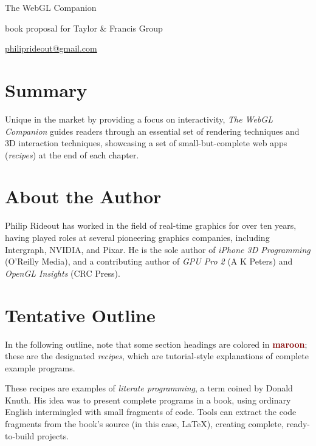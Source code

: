 \thispagestyle{empty}
\label{Proposal}
\LARGE

\noindent The WebGL Companion


\vspace{0.25in}
\noindent book proposal for Taylor \& Francis Group

\noindent \href{mailto:philiprideout@gmail.com}{philiprideout@gmail.com}
\normalsize

\renewcommand{\labelenumi}{Chapter \arabic{enumi}. }

\section*{Summary}
Unique in the market by providing a focus on interactivity, \emph{The WebGL Companion} guides readers through an essential set of rendering techniques and 3D interaction techniques, showcasing a set of small-but-complete web apps (\emph{recipes}) at the end of each chapter.

\section*{About the Author}

Philip Rideout has worked in the field of real-time graphics for over ten years, having played roles at several pioneering graphics companies, including Intergraph, NVIDIA, and Pixar.  He is the sole author of \emph{iPhone 3D Programming} (O'Reilly Media), and a contributing author of \emph{GPU Pro 2} (A K Peters) and \emph{OpenGL Insights} (CRC Press).

\section*{Tentative Outline}

In the following outline, note that some section headings are colored in \textbf{\textcolor{Maroon}{maroon}}; these are the designated \emph{recipes}, which are tutorial-style explanations of complete example programs.

These recipes are examples of \emph{literate programming}, a term coined by Donald Knuth.  His idea was to present complete programs in a book, using ordinary English intermingled with small fragments of code.  Tools can extract the code fragments from the book's source (in this case, \LaTeX), creating complete, ready-to-build projects.

